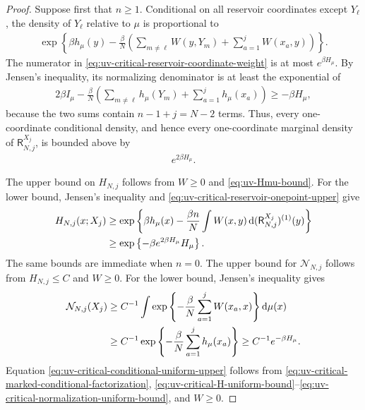 \documentclass[11pt,reqno]{amsart}
\numberwithin{equation}{section}
\theoremstyle{plain}
\theoremstyle{remark}
\newcommand{\md}{\mathrm{d}}
\newcommand{\be}{\beta}
\begin{document}
\begin{proof}
Suppose first that \(n\ge1\).  Conditional on all reservoir coordinates except \(Y_\ell\), the density of \(Y_\ell\) relative to \(\mu\) is proportional to
\begin{align}\label{eq:uv-critical-reservoir-coordinate-weight}
 \exp\left\{
 \be h_\mu(y)-\frac\be N\left(
 \sum_{m\ne\ell}W(y,Y_m)+\sum_{a=1}^jW(x_a,y)
 \right)\right\}.
\end{align}
The numerator in \eqref{eq:uv-critical-reservoir-coordinate-weight} is at most \(e^{\be H_\mu}\).  By Jensen's inequality, its normalizing denominator is at least the exponential of
\begin{align}\label{eq:uv-critical-reservoir-coordinate-denominator}
 2\be I_\mu
 -\frac\be N\left(\sum_{m\ne\ell}h_\mu(Y_m)+\sum_{a=1}^jh_\mu(x_a)\right)
 \ge-\be H_\mu,
\end{align}
because the two sums contain \(n-1+j=N-2\) terms.  Thus, every one-coordinate conditional density, and hence every one-coordinate marginal density of \(\mathsf R_{N,j}^{X_j}\), is bounded above by
\begin{align}\label{eq:uv-critical-reservoir-onepoint-upper}
 e^{2\be H_\mu}.
\end{align}

The upper bound on \(H_{N,j}\) follows from \(W\ge0\) and \eqref{eq:uv-Hmu-bound}.  For the lower bound, Jensen's inequality and \eqref{eq:uv-critical-reservoir-onepoint-upper} give
\begin{align}\label{eq:uv-critical-H-lower}
 H_{N,j}(x;X_j)
 &\ge
 \exp\left\{
 \be h_\mu(x)-\frac{\be n}{N}
 \int W(x,y)\,\md(\mathsf R_{N,j}^{X_j})^{(1)}(y)
 \right\}\notag\\
 &\ge \exp\left\{-\be e^{2\be H_\mu}H_\mu\right\}.
\end{align}
The same bounds are immediate when \(n=0\).  The upper bound for \(\mathcal N_{N,j}\) follows from \(H_{N,j}\le C\) and \(W\ge0\).  For the lower bound, Jensen's inequality gives
\begin{align}\label{eq:uv-critical-normalization-lower}
 \mathcal N_{N,j}(X_j)
 &\ge C^{-1}\int
 \exp\left\{-\frac\be N\sum_{a=1}^jW(x_a,x)\right\}\md\mu(x)\notag\\
 &\ge C^{-1}\exp\left\{-\frac\be N\sum_{a=1}^jh_\mu(x_a)\right\}
 \ge C^{-1}e^{-\be H_\mu}.
\end{align}
Equation \eqref{eq:uv-critical-conditional-uniform-upper} follows from \eqref{eq:uv-critical-marked-conditional-factorization}, \eqref{eq:uv-critical-H-uniform-bound}--\eqref{eq:uv-critical-normalization-uniform-bound}, and \(W\ge0\).


\end{proof}
\end{document}
